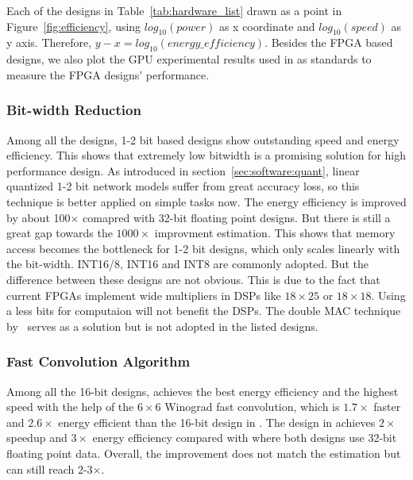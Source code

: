 Each of the designs in Table~\ref{tab:hardware_list} drawn as a point in Figure~\ref{fig:efficiency}, using $log_{10}(power)$ as x coordinate and $log_{10}(speed)$ as y axis. Therefore, $y-x=log_{10}(energy\_efficiency)$. Besides the FPGA based designs, we also plot the GPU experimental results used in \cite{guo2017angel, han2017ese} as standards to measure the FPGA designs' performance.

\subsubsection{Bit-width Reduction} Among all the designs, 1-2 bit based designs show outstanding speed and energy efficiency. This shows that extremely low bitwidth is a promising solution for high performance design. As introduced in section~\ref{sec:software:quant}, linear quantized 1-2 bit network models suffer from great accuracy loss, so this technique is better applied on simple tasks now. The energy efficiency is improved by about 100$\times$ comapred with 32-bit floating point designs. But there is still a great gap towards the $1000\times$ improvment estimation. This shows that memory access becomes the bottleneck for 1-2 bit designs, which only scales linearly with the bit-width. INT16/8, INT16 and INT8 are commonly adopted. But the difference between these designs are not obvious. This is due to the fact that current FPGAs implement wide multipliers in DSPs like $18\times 25$ or $18\times 18$. Using a less bits for computaion will not benefit the DSPs. The double MAC technique by~\cite{nguyen2017double} serves as a solution but is not adopted in the listed designs.

\subsubsection{Fast Convolution Algorithm} Among all the 16-bit designs, \cite{lu2017evaluating} achieves the best energy efficiency and the highest speed with the help of the $6\times 6$ Winograd fast convolution, which is $1.7\times$ faster and $2.6\times$ energy efficient than the 16-bit design in \cite{zhang2017improving}. The design in \cite{zhang2017frequency} achieves $2\times$ speedup and $3\times$ energy efficiency compared with \cite{zhang2015optimizing} where both designs use 32-bit floating point data. Overall, the improvement does not match the estimation but can still reach 2-3$\times$.

